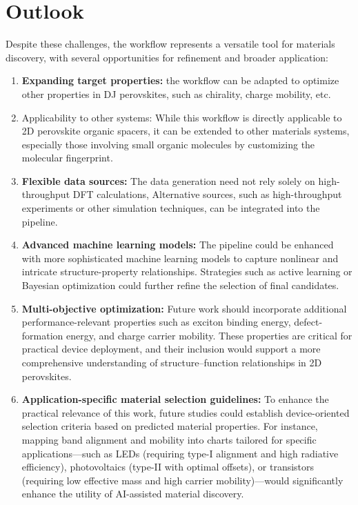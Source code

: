 \section{Outlook}

Despite these challenges, the workflow represents a versatile tool for materials discovery, with several opportunities for refinement and broader application: 
\begin{enumerate}
    \item \textbf{Expanding target properties:} the workflow can be adapted to optimize other properties in DJ perovskites, such as chirality, charge mobility, etc.
    \item Applicability to other systems: While this workflow is directly applicable to 2D perovskite organic spacers, it can be extended to other materials systems, especially those involving small organic molecules by customizing the molecular fingerprint.
    \item \textbf{Flexible data sources:} The data generation need not rely solely on high-throughput DFT calculations, Alternative sources, such as high-throughput experiments or other simulation techniques, can be integrated into the pipeline.
    \item \textbf{Advanced machine learning models:} The pipeline could be enhanced with more sophisticated machine learning models to capture nonlinear and intricate structure-property relationships. Strategies such as active learning or Bayesian optimization could further refine the selection of final candidates. 
    \item \textbf{Multi-objective optimization:} Future work should incorporate additional performance-relevant properties such as exciton binding energy, defect-formation energy, and charge carrier mobility. These properties are critical for practical device deployment, and their inclusion would support a more comprehensive understanding of structure–function relationships in 2D perovskites.
    \item \textbf{Application-specific material selection guidelines:} To enhance the practical relevance of this work, future studies could establish device-oriented selection criteria based on predicted material properties. For instance, mapping band alignment and mobility into charts tailored for specific applications—such as LEDs (requiring type-I alignment and high radiative efficiency), photovoltaics (type-II with optimal offsets), or transistors (requiring low effective mass and high carrier mobility)—would significantly enhance the utility of AI-assisted material discovery.
\end{enumerate}


